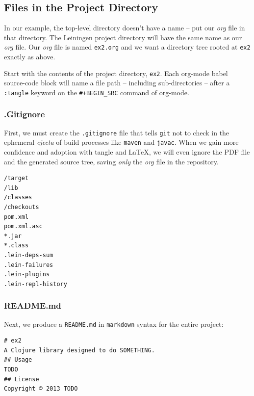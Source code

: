 \documentclass[11pt]{article}
\begin{document}
\subsection{Files in the Project Directory}
\label{sec-2-1}
In our example, the top-level directory doesn't have a name --
put our \emph{org} file in that directory. The Leiningen project directory
will have the same name as our \emph{org} file. Our \emph{org} file is named
\verb+ex2.org+ and we want a directory tree rooted at \verb+ex2+
exactly as above.

Start with the contents of the project directory, \verb+ex2+. Each
org-mode babel source-code block will name a file path -- including
sub-directories -- after a \verb+:tangle+ keyword on the
\texttt{\#+BEGIN\_SRC} command of org-mode.
\subsubsection{.Gitignore}
\label{sec-2-1-1}
First, we must create the \verb+.gitignore+ file that tells
\verb+git+ not to check in the ephemeral \emph{ejecta} of build
processes like \verb+maven+ and \verb+javac+. When we gain more
confidence and adoption with tangle and \LaTeX{}, we will even
ignore the PDF file and the generated source tree, saving \emph{only}
the \emph{org} file in the repository.
\begin{verbatim}
/target
/lib
/classes
/checkouts
pom.xml
pom.xml.asc
*.jar
*.class
.lein-deps-sum
.lein-failures
.lein-plugins
.lein-repl-history
\end{verbatim}

\subsubsection{README.md}
\label{sec-2-1-2}
Next, we produce a \verb+README.md+ in \verb+markdown+ syntax for
the entire project:
\begin{verbatim}
# ex2
A Clojure library designed to do SOMETHING.
## Usage
TODO
## License
Copyright © 2013 TODO
\end{verbatim}
\end{document}
